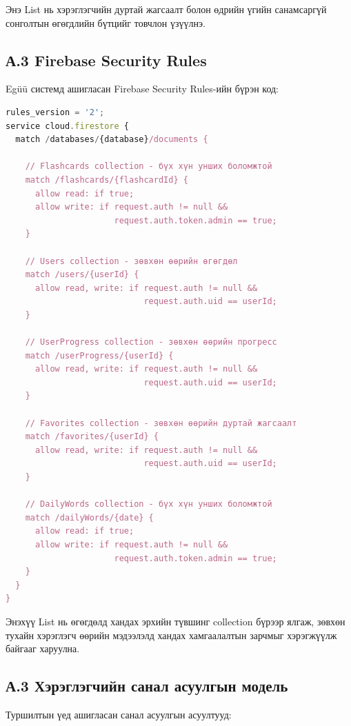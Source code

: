 Энэ List нь хэрэглэгчийн дуртай жагсаалт болон өдрийн үгийн санамсаргүй сонголтын өгөгдлийн бүтцийг товчлон үзүүлнэ.

\subsection*{А.3 Firebase Security Rules}

Egüü системд ашигласан Firebase Security Rules-ийн бүрэн код:

\begin{lstlisting}[language=JavaScript, caption=Firestore security rules-ийн код, label={lst:firestore-rules}]
rules_version = '2';
service cloud.firestore {
  match /databases/{database}/documents {
    
    // Flashcards collection - бүх хүн унших боломжтой
    match /flashcards/{flashcardId} {
      allow read: if true;
      allow write: if request.auth != null && 
                      request.auth.token.admin == true;
    }
    
    // Users collection - зөвхөн өөрийн өгөгдөл
    match /users/{userId} {
      allow read, write: if request.auth != null && 
                            request.auth.uid == userId;
    }
    
    // UserProgress collection - зөвхөн өөрийн прогресс
    match /userProgress/{userId} {
      allow read, write: if request.auth != null && 
                            request.auth.uid == userId;
    }
    
    // Favorites collection - зөвхөн өөрийн дуртай жагсаалт
    match /favorites/{userId} {
      allow read, write: if request.auth != null && 
                            request.auth.uid == userId;
    }
    
    // DailyWords collection - бүх хүн унших боломжтой
    match /dailyWords/{date} {
      allow read: if true;
      allow write: if request.auth != null && 
                      request.auth.token.admin == true;
    }
  }
}
\end{lstlisting}

Энэхүү List нь өгөгдөлд хандах эрхийн түвшинг collection бүрээр ялгаж, зөвхөн тухайн хэрэглэгч өөрийн мэдээлэлд хандах хамгаалалтын зарчмыг хэрэгжүүлж байгааг харуулна.

\subsection*{А.3 Хэрэглэгчийн санал асуулгын модель}

Туршилтын үед ашигласан санал асуулгын асуултууд:

